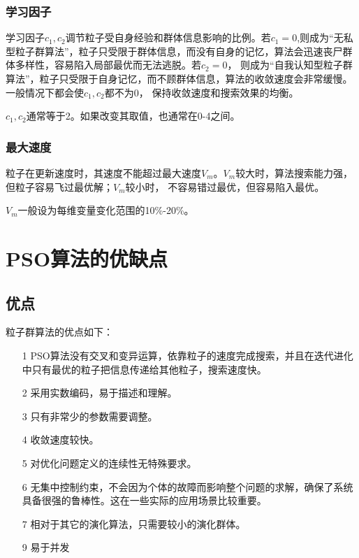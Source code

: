 \documentclass[8pt]{article}
\begin{document}
\subsubsection{学习因子}
	学习因子$c_1, c_2$调节粒子受自身经验和群体信息影响的比例。若$c_1=0$,则成为“无私型粒子群算法”，粒子只受限于群体信息，而没有自身的记忆，算法会迅速丧尸群体多样性，容易陷入局部最优而无法逃脱。若$c_2=0$， 则成为“自我认知型粒子群算法”，粒子只受限于自身记忆，而不顾群体信息，算法的收敛速度会非常缓慢。一般情况下都会使$c_1,c_2$都不为0， 保持收敛速度和搜索效果的均衡。
\par
	$c_1,c_2$通常等于2。如果改变其取值，也通常在0-4之间。

\subsubsection{最大速度}
	粒子在更新速度时，其速度不能超过最大速度$V_m$。$V_m$较大时，算法搜索能力强，但粒子容易飞过最优解；$V_m$较小时， 不容易错过最优，但容易陷入最优。
\par	
	$V_m$一般设为每维变量变化范围的10\%-20\%。

\section{PSO算法的优缺点}
\subsection{优点}
粒子群算法的优点如下：
\begin{itemize}[leftmargin=4em]
	\setlength{\itemsep}{0pt}
	\setlength{\parsep}{0pt}
	\setlength{\parskip}{0pt}
	\item[1] PSO算法没有交叉和变异运算，依靠粒子的速度完成搜索，并且在迭代进化中只有最优的粒子把信息传递给其他粒子，搜索速度快。
	\item[2] 采用实数编码，易于描述和理解。
	\item[3] 只有非常少的参数需要调整。
	\item[4] 收敛速度较快。
	\item[5] 对优化问题定义的连续性无特殊要求。
	\item[6] 无集中控制约束，不会因为个体的故障而影响整个问题的求解，确保了系统具备很强的鲁棒性。这在一些实际的应用场景比较重要。
	\item[7] 相对于其它的演化算法，只需要较小的演化群体。
	\item[9] 易于并发
\end{itemize}
\end{document}
